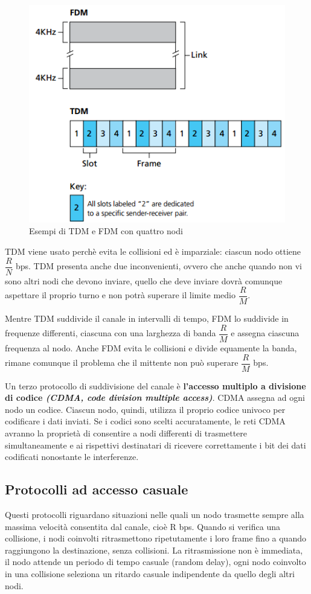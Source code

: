 \documentclass[11pt,a4paper]{book}
\begin{document}
\begin{figure}
	\begin{center}
		\includegraphics[scale=0.6]{img/077.png}
		\caption{Esempi di TDM e FDM con quattro nodi}
		\label{fig: 077}
	\end{center}
\end{figure}
TDM viene usato perchè evita le collisioni ed è imparziale: ciascun nodo ottiene $\dfrac{R}{N}$ bps. TDM presenta anche due inconvenienti, ovvero che anche quando non vi sono altri nodi che devono inviare, quello che deve inviare dovrà comunque aspettare il proprio turno e non potrà superare il limite medio $\dfrac{R}{M}$.

Mentre TDM suddivide il canale in intervalli di tempo, FDM lo suddivide in frequenze differenti, ciascuna con una larghezza di banda $\dfrac{R}{M}$ e assegna ciascuna frequenza al nodo. Anche FDM evita le collisioni e divide equamente la banda, rimane comunque il problema che il mittente non può superare $\dfrac{R}{M}$ bps.

Un terzo protocollo di suddivisione del canale è \textbf{l'accesso multiplo a divisione di codice \textit{(CDMA, code division multiple access)}}. CDMA assegna ad ogni nodo un codice. Ciascun nodo, quindi, utilizza il proprio codice univoco per codificare i dati inviati. Se i codici sono scelti accuratamente, le reti CDMA avranno la proprietà di consentire a nodi differenti di trasmettere simultaneamente e ai rispettivi destinatari di ricevere correttamente i bit dei dati codificati nonostante le interferenze.

\subsection{Protocolli ad accesso casuale}
Questi protocolli riguardano situazioni nelle quali un nodo trasmette sempre alla massima velocità consentita dal canale, cioè R bps. Quando si verifica una collisione, i nodi coinvolti ritrasmettono ripetutamente i loro frame fino a quando raggiungono la destinazione, senza collisioni. La ritrasmissione non è immediata, il nodo attende un periodo di tempo casuale (random delay), ogni nodo coinvolto in una collisione seleziona un ritardo casuale indipendente da quello degli altri nodi.
\end{document}
